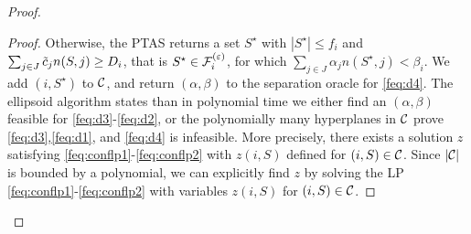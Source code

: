 \begin{proof}
\begin{proof}
Otherwise, the PTAS  returns a set $S^\star$ with $|S^\star|\le f_i$ and $\sum_{j\in J}\tilde{c}_j n(S,j) \geq D_i$, that is $S^\star \in {\cal F}^{(\varepsilon)}_i$, for which
$\sum_{j\in J}\alpha_j n(S^\star,j) < \beta_i$. We add $(i,S^\star)$ to ${\cal C}$, and return $(\alpha,\beta)$ to the separation oracle for \eqref{feq:d4}.
The ellipsoid algorithm states than in polynomial time we either find an $(\alpha,\beta)$ feasible for \eqref{feq:d3}-\eqref{feq:d2}, or the polynomially many hyperplanes
in ${\cal C}$ prove \eqref{feq:d3},\eqref{feq:d1}, and \eqref{feq:d4} is infeasible.
More precisely, there exists a solution $z$ satisfying \eqref{feq:conflp1}-\eqref{feq:conflp2} with $z(i,S)$ defined for $(i,S)\in {\cal C}$.
Since $|{\cal C}|$ is bounded by a polynomial, we can explicitly find $z$ by solving the LP \eqref{feq:conflp1}-\eqref{feq:conflp2} with variables $z(i,S)$ for $(i,S)\in {\cal C}$.
\end{proof}\end{proof}


